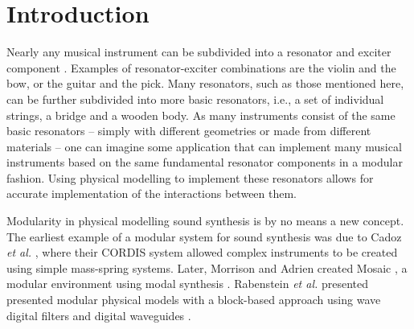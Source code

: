\documentclass{article}
\title{\papertitle}
\begin{document}
%
\capstartfalse
\maketitle
\capstarttrue
%
\begin{abstract}
Through recent advances in processing power, physical modelling using finite-difference time-domain (FDTD) methods has gained popularity. Many different musical instrument models based on these methods exist, and nearly all are based on the same underlying systems and interactions between them. This paper presents an application where individual resonator modules, such as strings, bars, membranes and plates, can be connected and interacted with in real time.  Various excitations, including the bow, hammer and pluck, are implemented as well, allowing for expressive control and a wide sonic palette. Existing and non-existing model configurations can easily be implemented, modified and experimented with, as well as the parameters describing them.
\end{abstract}
%

\section{Introduction}\label{sec:introduction}
Nearly any musical instrument can be subdivided into a resonator and exciter component \cite{Borin1989}. Examples of resonator-exciter combinations are the violin and the bow, or the guitar and the pick. Many resonators, such as those mentioned here, can be further subdivided into more basic resonators, i.e., a set of individual strings, a bridge and a wooden body. As many instruments consist of the same basic resonators -- simply with different geometries or made from different materials -- one can imagine some application that can implement many musical instruments based on the same fundamental resonator components in a modular fashion. Using physical modelling to implement these resonators allows for accurate implementation of the interactions between them.  

Modularity in physical modelling sound synthesis is by no means a new concept. The earliest example of a modular system for sound synthesis was due to Cadoz \textit{et al.} \cite{Cadoz1983}, where their CORDIS system allowed complex instruments to be created using simple mass-spring systems. Later, Morrison and Adrien created Mosaic \cite{Morrison1993}, a modular environment using modal synthesis \cite{Adrien1991}. Rabenstein \textit{et al.} presented presented modular physical models with a block-based approach using wave digital filters \cite{Rabenstein2007} and digital waveguides \cite{Smith1992}. 
\end{document}
